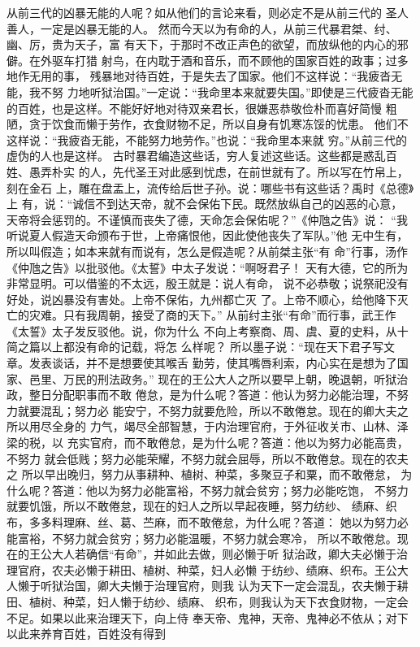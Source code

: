 \documentclass[12pt,UTF8]{ctexbook}
\begin{document}
从前三代的凶暴无能的人呢？如从他们的言论来看，则必定不是从前三代的 
圣人善人，一定是凶暴无能的人。 
然而今天以为有命的人，从前三代暴君桀、纣、幽、厉，贵为天子，富 
有天下，于那时不改正声色的欲望，而放纵他的内心的邪僻。在外驱车打猎 
射鸟，在内耽于酒和音乐，而不顾他的国家百姓的政事；过多地作无用的事， 
残暴地对待百姓，于是失去了国家。他们不这样说：“我疲沓无能，我不努 
力地听狱治国。”一定说：“我命里本来就要失国。”即使是三代疲沓无能 
的百姓，也是这样。不能好好地对待双亲君长，很嫌恶恭敬俭朴而喜好简慢 
粗陋，贪于饮食而懒于劳作，衣食财物不足，所以自身有饥寒冻馁的忧患。 
他们不这样说：“我疲沓无能，不能努力地劳作。”也说：“我命里本来就 
穷。”从前三代的虚伪的人也是这样。 
古时暴君编造这些话，穷人复述这些话。这些都是惑乱百姓、愚弄朴实 
的人，先代圣王对此感到忧虑，在前世就有了。所以写在竹帛上，刻在金石 
上，雕在盘盂上，流传给后世子孙。说：哪些书有这些话？禹时《总德》上 
有，说：“诚信不到达天帝，就不会保佑下民。既然放纵自己的凶恶的心意， 
天帝将会惩罚的。不谨慎而丧失了德，天命怎会保佑呢？”《仲虺之告》说： 
“我听说夏人假造天命颁布于世，上帝痛恨他，因此使他丧失了军队。”他 
无中生有，所以叫假造；如本来就有而说有，怎么是假造呢？从前桀主张“有 
命”行事，汤作《仲虺之告》以批驳他。《太誓》中太子发说：“啊呀君子！ 
天有大德，它的所为非常显明。可以借鉴的不太远，殷王就是：说人有命， 
说不必恭敬；说祭祀没有好处，说凶暴没有害处。上帝不保佑，九州都亡灭 
了。上帝不顺心，给他降下灭亡的灾难。只有我周朝，接受了商的天下。” 
从前纣主张“有命”而行事，武王作《太誓》太子发反驳他。说，你为什么 
不向上考察商、周、虞、夏的史料，从十简之篇以上都没有命的记载，将怎 
么样呢？ 
所以墨子说：“现在天下君子写文章。发表谈话，并不是想要使其喉舌 
勤劳，使其嘴唇利索，内心实在是想为了国家、邑里、万民的刑法政务。” 
现在的王公大人之所以要早上朝，晚退朝，听狱治政，整日分配职事而不敢 
倦怠，是为什么呢？答道：他认为努力必能治理，不努力就要混乱；努力必 
能安宁，不努力就要危险，所以不敢倦怠。现在的卿大夫之所以用尽全身的 
力气，竭尽全部智慧，于内治理官府，于外征收关市、山林、泽梁的税，以 
充实官府，而不敢倦怠，是为什么呢？答道：他以为努力必能高贵，不努力 
就会低贱；努力必能荣耀，不努力就会屈辱，所以不敢倦怠。现在的农夫之 
所以早出晚归，努力从事耕种、植树、种菜，多聚豆子和粟，而不敢倦怠， 
为什么呢？答道：他以为努力必能富裕，不努力就会贫穷；努力必能吃饱， 
不努力就要饥饿，所以不敢倦怠，现在的妇人之所以早起夜睡，努力纺纱、 
绩麻、织布，多多料理麻、丝、葛、苎麻，而不敢倦怠，为什么呢？答道： 
她以为努力必能富裕，不努力就会贫穷；努力必能温暖，不努力就会寒冷， 
所以不敢倦怠。现在的王公大人若确信“有命”，并如此去做，则必懒于听 
狱治政，卿大夫必懒于治理官府，农夫必懒于耕田、植树、种菜，妇人必懒 
于纺纱、绩麻、织布。王公大人懒于听狱治国，卿大夫懒于治理官府，则我 
认为天下一定会混乱，农夫懒于耕田、植树、种菜，妇人懒于纺纱、绩麻、 
织布，则我认为天下衣食财物，一定会不足。如果以此来治理天下，向上侍 
奉天帝、鬼神，天帝、鬼神必不依从；对下以此来养育百姓，百姓没有得到 
\end{document}
